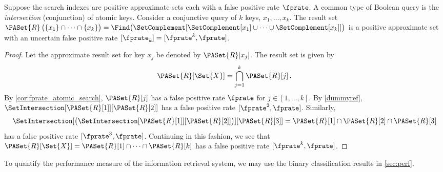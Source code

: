\documentclass[ ../main.tex]{subfiles}
\begin{document}
\begin{example}
Suppose the search indexes are positive approximate sets each with a false positive rate $\fprate$. A common type of Boolean query is the \emph{intersection} (conjunction) of atomic keys. Consider a conjunctive query of $k$ keys, $x_1,\ldots,x_k$. The result set $\PASet{R}\left(\{x_1\} \cap \cdots \cap \{x_k\}\right) = \Find\!\left(\SetComplement[\SetComplement[x_1] \cup \cdots \cup \SetComplement[x_k]]\right)$ is a positive approximate set with an uncertain false positive rate $[\fprate_k] = [\fprate^k, \fprate]$.
\begin{proof}
Let the approximate result set for key $x_j$ be denoted by $\PASet{R}[x_j]$. The result set is given by
\begin{equation}
    \PASet{R}[\Set{X}] = \bigcap_{j=1}^{k} \PASet{R}[j]\,.
\end{equation}
By \cref{cor:fprate_atomic_search}, $\PASet{R}[j]$ has a false positive rate $\fprate$ for $j \in [1,\ldots,k]$. By \cref{dummyref}, $\SetIntersection[\PASet{R}[1]][\PASet{R}[2]]$ has a false positive rate $[\fprate^2,\fprate]$. Similarly,
\begin{equation}
\SetIntersection[\left(\SetIntersection[\PASet{R}[1]][\PASet{R}[2]]\right)][\PASet{R}[3]] = \PASet{R}[1] \cap \PASet{R}[2] \cap \PASet{R}[3]    
\end{equation}
has a false positive rate $[\fprate^3,\fprate]$. Continuing in this fashion, we see that $\PASet{R}[\Set{X}] = \PASet{R}[1] \cap \cdots \cap \PASet{R}[k]$ has a false positive rate $[\fprate^k,\fprate]$.
\end{proof}
\end{example}

To quantify the performance measure of the information retrieval system, we may use the binary classification results in \cref{sec:perf}.
\end{document}
